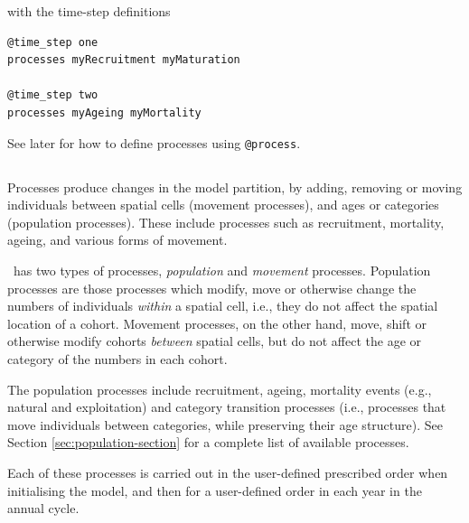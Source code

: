 with the time-step definitions 
{\small{\begin{verbatim}
@time_step one
processes myRecruitment myMaturation

@time_step two
processes myAgeing myMortality
\end{verbatim}}}

See later for how to define processes using \texttt{@process}. 

\subsection{}

Processes produce changes in the model partition, by adding, removing or moving individuals between spatial cells (movement processes), and ages or categories (population processes). These include processes such as recruitment, mortality, ageing, and various forms of movement.

\SPM\ has two types of processes, \emph{population} and \emph{movement} processes. Population processes are those processes which modify, move or otherwise change the numbers of individuals \emph{within} a spatial cell, i.e., they do not affect the spatial location of a cohort. Movement processes, on the other hand, move, shift or otherwise modify cohorts \emph{between} spatial cells, but do not affect the age or category of the numbers in each cohort. 

The population processes include recruitment, ageing,  mortality events (e.g., natural and exploitation) and category transition processes (i.e., processes that move individuals between categories, while preserving their age structure). See Section \ref{sec:population-section} for a complete list of available processes.

Each of these processes is carried out in the user-defined prescribed order when initialising the model, and then for a user-defined order in each year in the annual cycle.

